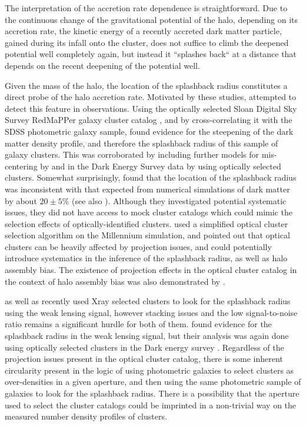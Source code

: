 \documentclass[iop, apjl, twocolappendix, numberedappendix]{emulateapj}
\begin{document}
The interpretation of the accretion rate dependence is
straightforward. Due to the continuous change of the gravitational
potential of the halo, depending on its accretion rate, the kinetic
energy of a recently accreted dark matter particle, gained during
its infall onto the cluster, does not suffice to climb the deepened
potential well completely again, but instead it ``splashes back`` at
a distance that depends on the recent deepening of the potential
well.

Given the mass of the halo, the location of the splashback radius
constitutes a direct probe of the halo accretion rate. Motivated by
these studies, \citet{more2016detection} attempted to detect this
feature in observations. Using the optically selected Sloan Digital
Sky Survey RedMaPPer galaxy cluster catalog
\citep{rykoff2014redmapper}, and by cross-correlating it with the
SDSS photometric galaxy sample, \citet{more2016detection} found evidence
for the steepening of the dark matter density profile, and therefore
the splashback radius of this sample of galaxy clusters. This was 
corroborated by including further models for mis-centering by
\citet{baxter2017halo} and in the Dark Energy Survey data by
\citet{chang2017splashback} using optically selected clusters. Somewhat surprisingly,
\citet{more2016detection} found that the location of the splashback radius was
inconsistent with that expected from numerical simulations of dark matter by
about $20\pm5$\% (see also \citet{baxter2017halo, chang2017splashback}).
Although they
investigated potential systematic issues, they did not have access
to mock cluster catalogs which could mimic the selection effects of
optically-identified clusters. \citet{busch2017assembly} used a
simplified optical cluster selection algorithm on the Millennium
simulation, and pointed out that optical clusters can be heavily
affected by projection issues, and could potentially introduce
systematics in the inference of the splashback radius, as well as
halo assembly bias. The existence of projection effects in the
optical cluster catalog in the context of halo assembly bias was 
also demonstrated by \citet{zu2016level}.

\citet{umetsu2017lensing} as well as \citet{contigiani2018weak}
recently used Xray selected clusters to look for the splashback radius
using the weak lensing signal, however stacking issues and the low
signal-to-noise ratio remains a significant hurdle for both of them.
\citet{chang2017splashback} found evidence for the splashback radius
in the weak lensing signal, but their analysis was again done using
optically selected clusters in the Dark energy survey
\citep{dark2005dark}. Regardless of the projection issues present in
the optical cluster catalog, there is some inherent circularity
present in the logic of using photometric galaxies to select
clusters as over-densities in a given aperture, and then using the
same photometric sample of galaxies to look for the splashback
radius. There is a possibility that the aperture used to select the
cluster catalogs could be imprinted in a non-trivial way on the measured number
density profiles of clusters.
\end{document}
